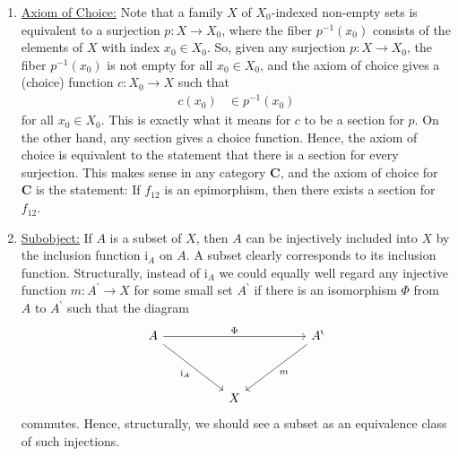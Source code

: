 \begin{exa}
\begin{enumerate}
\begin{align*}
\end{align*}
while dually a morphism
\begin{align*}
  r
  \in
  \mathrm{mor}_{\mathbf{C}}(X_{2},X_{1})
\end{align*}
is a \textbf{retraction (for $f_{12}$)} if
\begin{align*}
  r
  \circ
  f_{12}
  &=
  \mathrm{id}_{X_{1}}
\end{align*}
The connection to isomorphisms is obvious.
Note that sections are monomorphisms and retractions are epimorphisms.
If we were motivating our terminology algebraically, we would call sections split monomorphisms and retractions split epimorphisms.
\item[$\bullet$]
\underline{Axiom of Choice:}
Note that a family $X$ of $X_{0}$-indexed non-empty sets is equivalent to a surjection $p \colon X \rightarrow X_{0}$, where the fiber $p^{-1}(x_{0})$ consists of the elements of $X$ with index $x_{0} \in X_{0}$.
So, given any surjection $p \colon X \rightarrow X_{0}$, the fiber $p^{-1}(x_{0})$ is not empty for all $x_{0} \in X_{0}$, and the axiom of choice gives a (choice) function $c \colon X_{0} \rightarrow X$ such that
\begin{align*}
  c(x_{0})
  &\in
  p^{-1}(x_{0})
\end{align*}
for all $x_{0} \in X_{0}$.
This is exactly what it means for $c$ to be a section for $p$.
On the other hand, any section gives a choice function.
Hence, the axiom of choice is equivalent to the statement that there is a section for every surjection.
This makes sense in any category $\mathbf{C}$, and the axiom of choice for $\mathbf{C}$ is the statement: If $f_{12}$ is an epimorphism, then there exists a section for $f_{12}$.
\item[$\bullet$]
\underline{Subobject:}
If $A$ is a subset of $X$, then $A$ can be injectively included into $X$ by the inclusion function $\mathrm{i}_{A}$ on $A$.
A subset clearly corresponds to its inclusion function.
Structurally, instead of $\mathrm{i}_{A}$ we could equally well regard any injective function $m \colon A^{\backprime} \rightarrow X$ for some small set $A^{\backprime}$ if there is an isomorphism $\Phi$ from $A$ to $A^{\backprime}$ such that the diagram
\[
\begin{tikzcd}[sep=huge]
  A
  \arrow{rr}{\Phi}
  \arrow[swap]{rd}{\mathrm{i}_{A}}
  &
  &
  A^{\backprime}
  \arrow{dl}{m}
  \\
  &
  X
\end{tikzcd}
\]
commutes.
Hence, structurally, we should see a subset as an equivalence class of such injections.

\end{enumerate}
\end{exa}
